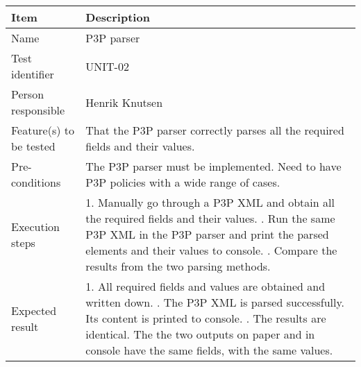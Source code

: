 		\begin{center}
			\begin{tabular}{ |  p{3.5cm} | p{10cm} | }
				\hline
				Item & Description \\ [5pt] \hline \hline
				Name & P3P parser \\  [5pt] \hline
				Test identifier & UNIT-02 \\  [5pt] \hline
				Person responsible & Henrik Knutsen \\  [5pt] \hline
				Feature(s) to be tested & That the P3P parser correctly parses all the required fields and their values. \\  [5pt] \hline
				Pre-conditions & The P3P parser must be implemented. Need to have P3P policies with a wide range of cases. \\  [5pt] \hline
				Execution steps & 1. Manually go through a P3P XML and obtain all the required fields and their values. \newline 2. Run the same P3P XML in the P3P parser and print the parsed elements and their values to console.
					\newline 3. Compare the results from the two parsing methods. \\  [5pt] \hline
				Expected result & 1. All required fields and values are obtained and written down. \newline 2. The P3P XML is parsed successfully. Its content is printed to console. \newline 3. The results are identical. The the two outputs on paper and in console have the same fields, 						with the same values. \\  [5pt] \hline
			\end{tabular}
		\end{center}
		
